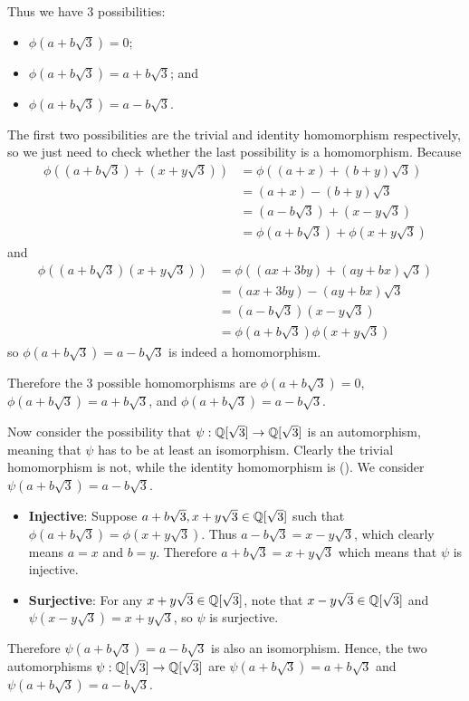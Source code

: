 \begin{questions}
    Thus we have 3 possibilities:
    \begin{itemize}
        \item $\phi(a+b\sqrt3) = 0$;
        \item $\phi(a+b\sqrt3) = a+b\sqrt3$; and
        \item $\phi(a+b\sqrt3) = a-b\sqrt3$.
    \end{itemize}
    The first two possibilities are the trivial and identity homomorphism respectively, so we just need to check whether the last possibility is a homomorphism. Because
    \begin{align*}
        \phi((a+b\sqrt3) + (x+y\sqrt3)) &= \phi((a+x)+(b+y)\sqrt3)\\
        &= (a+x)-(b+y)\sqrt3\\
        &= (a-b\sqrt3) + (x-y\sqrt3)\\
        &= \phi(a+b\sqrt3) + \phi(x+y\sqrt3)
    \end{align*}
    and
    \begin{align*}
        \phi((a+b\sqrt3)(x+y\sqrt3)) &= \phi((ax+3by)+(ay+bx)\sqrt3)\\
        &= (ax+3by)-(ay+bx)\sqrt3\\
        &= (a-b\sqrt3)(x-y\sqrt3)\\
        &= \phi(a+b\sqrt3)\phi(x+y\sqrt3)
    \end{align*}
    so $\phi(a+b\sqrt3) = a-b\sqrt3$ is indeed a homomorphism.

    Therefore the 3 possible homomorphisms are $\phi(a+b\sqrt3) = 0$, $\phi(a+b\sqrt3) = a+b\sqrt3$, and $\phi(a+b\sqrt3) = a-b\sqrt3$.

    Now consider the possibility that $\psi: \mathbb{Q}[\sqrt3] \to \mathbb{Q}[\sqrt3]$ is an automorphism, meaning that $\psi$ has to be at least an isomorphism. Clearly the trivial homomorphism is not, while the identity homomorphism is (). We consider $\psi(a+b\sqrt3) = a-b\sqrt3$.
    \begin{itemize}
        \item \textbf{Injective}: Suppose $a+b\sqrt3, x+y\sqrt3 \in \mathbb{Q}[\sqrt3]$ such that $\phi(a+b\sqrt3) = \phi(x+y\sqrt3)$. Thus $a - b\sqrt3 = x - y\sqrt3$, which clearly means $a = x$ and $b = y$. Therefore $a+b\sqrt3 = x+y\sqrt3$ which means that $\psi$ is injective.
        \item \textbf{Surjective}: For any $x+y\sqrt3 \in \mathbb{Q}[\sqrt3]$, note that $x-y\sqrt3 \in \mathbb{Q}[\sqrt3]$ and $\psi(x-y\sqrt3) = x+y\sqrt3$, so $\psi$ is surjective.
    \end{itemize}
    Therefore $\psi(a+b\sqrt3) = a-b\sqrt3$ is also an isomorphism. Hence, the two automorphisms $\psi: \mathbb{Q}[\sqrt3] \to \mathbb{Q}[\sqrt3]$ are $\psi(a+b\sqrt3) = a+b\sqrt3$ and $\psi(a+b\sqrt3) = a-b\sqrt3$.


\end{questions}
